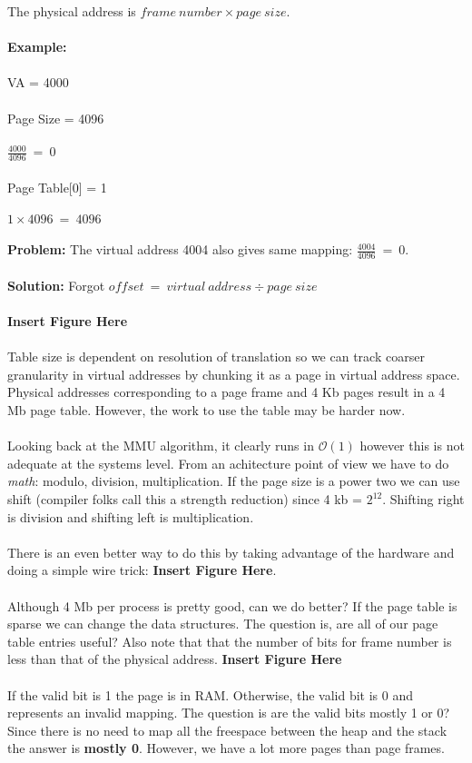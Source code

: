 \documentclass[../base_file/cs1550_notes.tex]{subfiles}
\begin{document}
The physical address is $frame\ number\times page\ size$.\\\\
\textbf{Example:}\\\\
VA = 4000\\\\
Page Size = 4096\\\\
$\frac{4000}{4096}\ =\ 0$\\\\
Page Table[0] = 1\\\\
$1\times 4096\ =\ 4096$\\\\
\textbf{Problem:}
The virtual address 4004 also gives same mapping: $\frac{4004}{4096}\ =\ 0$.\\\\
\textbf{Solution:} Forgot $offset\ =\ virtual\ address\div page\ size$\\\\
\textbf{Insert Figure Here}\\\\
Table size is dependent on resolution of translation so we can track coarser granularity in virtual addresses by
chunking it as a page in virtual address space.  Physical addresses corresponding to a page frame and 4 Kb pages
result in a 4 Mb page table.  However, the work to  use the table may be harder now.\\\\
Looking back at the MMU algorithm, it clearly runs in $\mathcal{O}(1)$ however this is not adequate at the 
systems level.  From an achitecture point of view we have to do \textit{math}: modulo, division, multiplication.
If the page size is a power two we can use shift (compiler folks call this a strength reduction) since 4 kb = 
$2^{12}$.  Shifting right is division and shifting left is multiplication.\\\\
There is an even better way to do this by taking advantage of the hardware and doing a simple wire trick:
\textbf{Insert Figure Here}.\\\\
Although 4 Mb per process is pretty good, can we do better?  If the page table is sparse we can change the data
structures.  The question is, are all of our page table entries useful?  Also note that that the number of bits 
for frame number is less than that of the physical address. \textbf{Insert Figure Here}\\\\
If the valid bit is 1 the page is in RAM\@.  Otherwise, the valid bit is 0 and represents an invalid mapping.  The
question is are the valid bits mostly 1 or 0?  Since there is no need to map all the freespace between the heap 
and the stack the answer is \textbf{mostly 0}.  However, we have a lot more pages than page frames.
\end{document}
